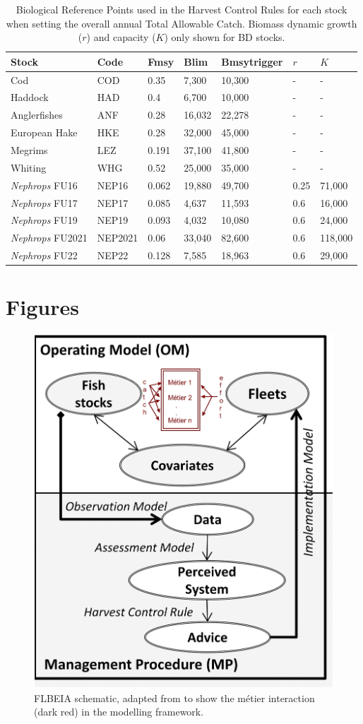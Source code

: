 \documentclass[12pt, halfline, a4paper]{ouparticle}
\begin{document}
\begin{table}[!ht]
	\center
	\begin{tabular}{p{3.2cm} p{2cm} p{2cm} p{2cm} p{2cm} p{1cm} p{1cm}}
		\toprule
		Stock & Code & Fmsy & Blim & Bmsytrigger & $r$ & $K$ \\
		\hline
		Cod & COD & 0.35 & 7,300  & 10,300 & - & - \\
		Haddock & HAD & 0.4 & 6,700 & 10,000 & - & -  \\
		Anglerfishes & ANF & 0.28 & 16,032 & 22,278 & - & -  \\
		European Hake & HKE & 0.28 & 32,000 & 45,000 & - & -  \\
		Megrims & LEZ & 0.191 & 37,100 & 41,800 & - & -  \\
		Whiting & WHG & 0.52 & 25,000 & 35,000 & - & -   \\
		\textit{Nephrops} FU16 & NEP16 & 0.062 & 19,880 & 49,700 & 0.25
		& 71,000  \\
		\textit{Nephrops} FU17 & NEP17 & 0.085 & 4,637 & 11,593 & 0.6 &
		16,000 \\
	        \textit{Nephrops} FU19 & NEP19 & 0.093 & 4,032 & 10,080 & 0.6 &
		24,000 \\
		\textit{Nephrops} FU2021 & NEP2021 & 0.06 & 33,040 & 82,600 &
		0.6 & 118,000 \\
		\textit{Nephrops} FU22 & NEP22 & 0.128 & 7,585 & 18,963 & 0.6 &
		29,000 \\
		\bottomrule
	\end{tabular}
	\label{tab:brp}
	\caption{Biological Reference Points used in the Harvest Control Rules
		for each stock when setting the overall annual Total Allowable
		Catch.  Biomass dynamic growth ($r$) and capacity ($K$) only
		shown for BD stocks.}
\end{table}

\clearpage

\section{Figures}

\begin{figure}[!ht]
	\centering
	\includegraphics[width=0.6\linewidth]{figures/FLBEIA}
	\caption{FLBEIA schematic, adapted from \cite{Garcia2017} to show the
		métier interaction (dark red) in the modelling framework.} 
	\label{fig:flbeia}
\end{figure}	
\end{document}
